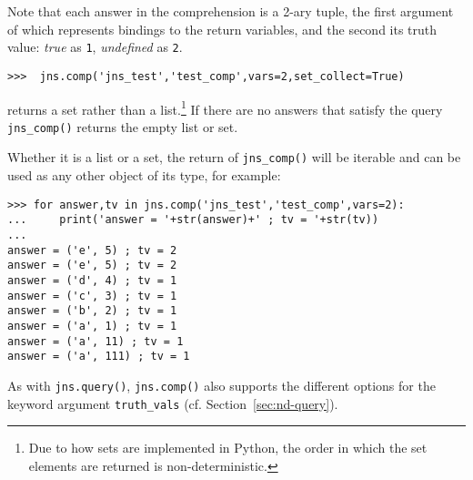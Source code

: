 \begin{example}
\noindent
Note that each answer in the comprehension is a 2-ary tuple, the first
argument of which represents bindings to the return variables, and the
second its truth value: {\em true} as {\tt 1}, {\em undefined} as {\tt 2}.


\begin{verbatim}
>>>  jns.comp('jns_test','test_comp',vars=2,set_collect=True)
\end{verbatim}

\noindent
returns a set rather than a list.\footnote{Due to how sets are
implemented in Python, the order in which the set elements are
returned is non-deterministic.}  If there are no answers that satisfy
the query {\tt jns\_comp()} returns the empty list or set. 


Whether it is a list or a set, the return of {\tt jns\_comp()} will be
iterable and can be used as any other object of its type, for
example:

{\small
  \begin{verbatim}
>>> for answer,tv in jns.comp('jns_test','test_comp',vars=2):
...     print('answer = '+str(answer)+' ; tv = '+str(tv))
... 
answer = ('e', 5) ; tv = 2
answer = ('e', 5) ; tv = 2
answer = ('d', 4) ; tv = 1
answer = ('c', 3) ; tv = 1
answer = ('b', 2) ; tv = 1
answer = ('a', 1) ; tv = 1
answer = ('a', 11) ; tv = 1
answer = ('a', 111) ; tv = 1
\end{verbatim}
  }
\end{example}

As with {\tt jns.query()}, {\tt jns.comp()} also supports the
different options for the keyword argument {\tt truth\_vals}
(cf. Section~\ref{sec:nd-query}).


